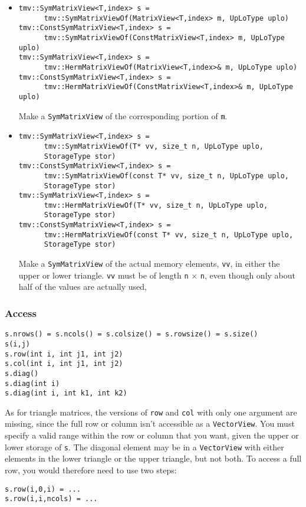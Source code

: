 \documentclass[twoside,letterpaper,11pt]{article}
\renewcommand{\tt}[1]{{\texttt {#1}}}
\begin{document}
\begin{itemize}
\item
\begin{verbatim}
tmv::SymMatrixView<T,index> s = 
      tmv::SymMatrixViewOf(MatrixView<T,index> m, UpLoType uplo)
tmv::ConstSymMatrixView<T,index> s = 
      tmv::SymMatrixViewOf(ConstMatrixView<T,index> m, UpLoType uplo)
tmv::SymMatrixView<T,index> s = 
      tmv::HermMatrixViewOf(MatrixView<T,index>& m, UpLoType uplo)
tmv::ConstSymMatrixView<T,index> s = 
      tmv::HermMatrixViewOf(ConstMatrixView<T,index>& m, UpLoType uplo)
\end{verbatim}
Make a \tt{SymMatrixView} of the corresponding portion of \tt{m}.

\item
\begin{verbatim}
tmv::SymMatrixView<T,index> s = 
      tmv::SymMatrixViewOf(T* vv, size_t n, UpLoType uplo, 
      StorageType stor)
tmv::ConstSymMatrixView<T,index> s =
      tmv::SymMatrixViewOf(const T* vv, size_t n, UpLoType uplo, 
      StorageType stor)
tmv::SymMatrixView<T,index> s =
      tmv::HermMatrixViewOf(T* vv, size_t n, UpLoType uplo, 
      StorageType stor)
tmv::ConstSymMatrixView<T,index> s =
      tmv::HermMatrixViewOf(const T* vv, size_t n, UpLoType uplo, 
      StorageType stor)
\end{verbatim}
Make a \tt{SymMatrixView} of the actual memory elements, \tt{vv}, in either the 
upper or lower triangle.
\tt{vv} must be of length \tt{n} $\times$ \tt{n}, even though only about half 
of the values are actually used,

\end{itemize}

\subsubsection{Access}

\begin{verbatim}
s.nrows() = s.ncols() = s.colsize() = s.rowsize() = s.size()
s(i,j)
s.row(int i, int j1, int j2)
s.col(int i, int j1, int j2)
s.diag()
s.diag(int i)
s.diag(int i, int k1, int k2)
\end{verbatim}
As for triangle matrices, the versions of \tt{row} and \tt{col} with only one argument are
missing, since the full row or column isn't accessible as a \tt{VectorView}.
You must specify a valid range within the row or column that you want, 
given the upper or lower storage of \tt{s}.
The diagonal element may be in a \tt{VectorView} with either elements in the 
lower triangle or the upper triangle, but not both.  To access a full row, you would 
therefore need to use two steps:
\begin{verbatim}
s.row(i,0,i) = ...
s.row(i,i,ncols) = ...
\end{verbatim}
\end{document}
